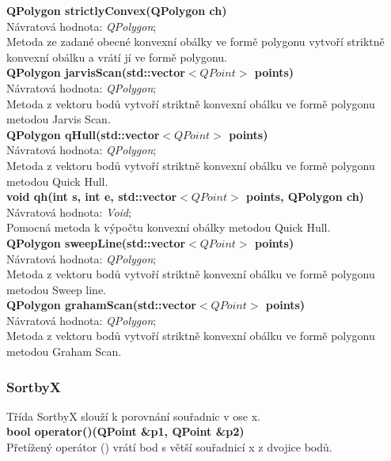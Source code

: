 \documentclass[a4paper, 12pt]{article}
\begin{document}
\textbf{QPolygon strictlyConvex(QPolygon ch)}\\
Návratová hodnota: \textit{QPolygon};\\
Metoda ze zadané obecné konvexní obálky ve formě polygonu vytvoří striktně konvexní obálku a vrátí jí ve formě polygonu.
\\

\textbf{QPolygon jarvisScan(std::vector$<QPoint>$ points)}\\
Návratová hodnota: \textit{QPolygon};\\
Metoda z vektoru bodů vytvoří striktně konvexní obálku ve formě polygonu metodou Jarvis Scan. 
\\

\textbf{QPolygon qHull(std::vector$<QPoint>$ points)}\\
Návratová hodnota: \textit{QPolygon};\\
Metoda z vektoru bodů vytvoří striktně konvexní obálku ve formě polygonu metodou Quick Hull. 
\\

\textbf{void qh(int s, int e, std::vector$<QPoint>$ points, QPolygon ch)}\\
Návratová hodnota: \textit{Void};\\
Pomocná metoda k výpočtu konvexní obálky metodou Quick Hull. 
\\

\textbf{QPolygon sweepLine(std::vector$<QPoint>$ points)}\\
Návratová hodnota: \textit{QPolygon};\\
Metoda z vektoru bodů vytvoří striktně konvexní obálku ve formě polygonu metodou Sweep line. 
\\

\textbf{QPolygon grahamScan(std::vector$<QPoint>$ points)}\\
Návratová hodnota: \textit{QPolygon};\\
Metoda z vektoru bodů vytvoří striktně konvexní obálku ve formě polygonu metodou Graham Scan. 
\\

\subsubsection{SortbyX}
Třída SortbyX slouží k porovnání souřadnic v ose x.\\


\textbf{bool operator()(QPoint \&p1, QPoint \&p2)}\\
Přetížený operátor () vrátí bod s větší souřadnicí x z dvojice bodů.\\
\end{document}
